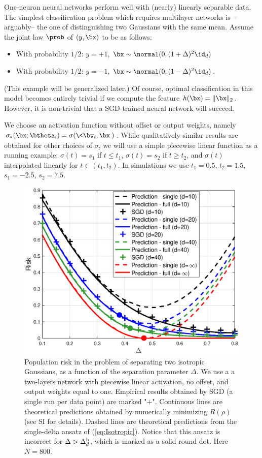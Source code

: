 \documentclass[11pt]{article}
\renewcommand{\eqref}[1]{(\ref{#1})}
\begin{document}
One-neuron neural networks perform well with (nearly)  linearly separable data.
The simplest classification problem which requires multilayer networks is --arguably-- the one of
distinguishing two Gaussians with the same mean.
Assume the joint law $\prob$ of $(y,\bx)$ to be as follows:
%
\begin{itemize}
%
\item[] With probability $1/2$: $y=+1$, $\bx\sim\normal(0,(1+\Delta)^2\id_d)$
\item[] With probability $1/2$: $y=-1$,
  $\bx\sim\normal(0,(1-\Delta)^2\id_d)$.
%
\end{itemize}
%
(This example will be generalized later.) 
Of course, optimal classification in this model becomes entirely trivial
if we compute the feature $h(\bx)= \|\bx\|_2$. However, it is non-trivial that a SGD-trained neural 
network will succeed.

We  choose an activation function without offset or output weights, namely $\sigma_*(\bx;\btheta_i) = \sigma(\<\bw_i,\bx\>)$. 
While qualitatively similar results are obtained for other choices of $\sigma$, 
we will use a simple piecewise linear function as a running example:
$\sigma(t) = s_1$ if $t\le t_1$, $\sigma(t) = s_2$ if $t\ge t_2$, and $\sigma(t)$ interpolated linearly for $t\in (t_1,t_2)$.
In simulations we use $t_1 = 0.5$, $t_2=1.5$, $s_1=-2.5$, $s_2=7.5$.


\begin{figure}[t!]
\begin{center}
\includegraphics[width=0.9\linewidth]{isotropic_risk_plot.eps}
\end{center}
\caption{Population risk in the problem of separating two isotropic Gaussians, as a function of the separation parameter $\Delta$. We use a  a two-layers network with piecewise linear activation, no offset, and output weights equal to one. Empirical results obtained by SGD (a single run per data point) are marked "$+$". Continuous lines are theoretical predictions obtained by numerically minimizing $R(\rho)$ (see SI for details). Dashed lines are theoretical predictions from the single-delta ansatz of \eqref{eq:Isotropic}. Notice that this ansatz is incorrect for $\Delta>\Delta_d^{\rm h}$, which is marked as a solid round dot. Here $N=800$.\label{fig:R_r_isotropic}}
\end{figure}
\end{document}
